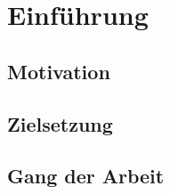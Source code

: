 \chapter{Einführung}
\label{ch:intro}

\section{Motivation}
\label{sec:intro:motivation}


\section{Zielsetzung}
\label{sec:intro:zielsetzung}

\section{Gang der Arbeit}
\label{sec:intro:gangDerArbeit}


